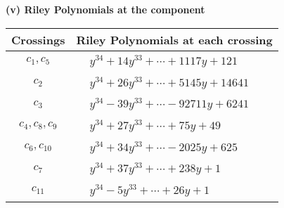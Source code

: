 \documentclass[1p]{elsarticle_modified}
\theoremstyle{definition}
\begin{document}
\flushleft \textbf{(v) Riley Polynomials at the component}\newline \\
\begin{tabular}{m{50pt}|m{274pt}}
Crossings & \hspace{64pt}Riley Polynomials at each crossing \\
\hline $$\begin{aligned}c_{1},c_{5}\end{aligned}$$&$\begin{aligned}
&y^{34}+14 y^{33}+\cdots+1117 y+121
\end{aligned}$\\
\hline $$\begin{aligned}c_{2}\end{aligned}$$&$\begin{aligned}
&y^{34}+26 y^{33}+\cdots+5145 y+14641
\end{aligned}$\\
\hline $$\begin{aligned}c_{3}\end{aligned}$$&$\begin{aligned}
&y^{34}-39 y^{33}+\cdots-92711 y+6241
\end{aligned}$\\
\hline $$\begin{aligned}c_{4},c_{8},c_{9}\end{aligned}$$&$\begin{aligned}
&y^{34}+27 y^{33}+\cdots+75 y+49
\end{aligned}$\\
\hline $$\begin{aligned}c_{6},c_{10}\end{aligned}$$&$\begin{aligned}
&y^{34}+34 y^{33}+\cdots-2025 y+625
\end{aligned}$\\
\hline $$\begin{aligned}c_{7}\end{aligned}$$&$\begin{aligned}
&y^{34}+37 y^{33}+\cdots+238 y+1
\end{aligned}$\\
\hline $$\begin{aligned}c_{11}\end{aligned}$$&$\begin{aligned}
&y^{34}-5 y^{33}+\cdots+26 y+1
\end{aligned}$\\
\hline
\end{tabular}\\~\\
\end{document}
